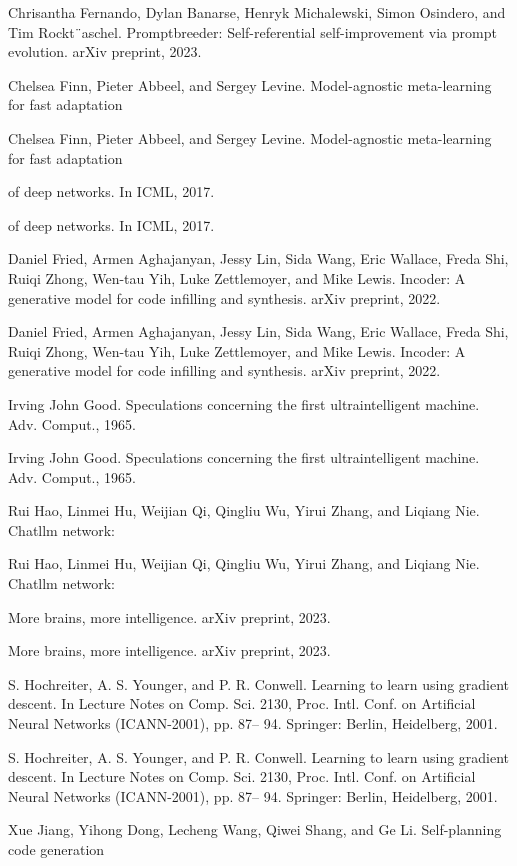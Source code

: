 \documentclass[12pt]{article}
\begin{document}
Chrisantha Fernando, Dylan Banarse, Henryk Michalewski, Simon Osindero, and Tim Rockt¨aschel.
Promptbreeder: Self-referential self-improvement via prompt evolution. arXiv preprint, 2023.


Chelsea Finn, Pieter Abbeel, and Sergey Levine. Model-agnostic meta-learning for fast adaptation


Chelsea Finn, Pieter Abbeel, and Sergey Levine. Model-agnostic meta-learning for fast adaptation


of deep networks. In ICML, 2017.


of deep networks. In ICML, 2017.


Daniel Fried, Armen Aghajanyan, Jessy Lin, Sida Wang, Eric Wallace, Freda Shi, Ruiqi Zhong,
Wen-tau Yih, Luke Zettlemoyer, and Mike Lewis. Incoder: A generative model for code infilling
and synthesis. arXiv preprint, 2022.


Daniel Fried, Armen Aghajanyan, Jessy Lin, Sida Wang, Eric Wallace, Freda Shi, Ruiqi Zhong,
Wen-tau Yih, Luke Zettlemoyer, and Mike Lewis. Incoder: A generative model for code infilling
and synthesis. arXiv preprint, 2022.


Irving John Good. Speculations concerning the first ultraintelligent machine. Adv. Comput., 1965.


Irving John Good. Speculations concerning the first ultraintelligent machine. Adv. Comput., 1965.


Rui Hao, Linmei Hu, Weijian Qi, Qingliu Wu, Yirui Zhang, and Liqiang Nie. Chatllm network:


Rui Hao, Linmei Hu, Weijian Qi, Qingliu Wu, Yirui Zhang, and Liqiang Nie. Chatllm network:


More brains, more intelligence. arXiv preprint, 2023.


More brains, more intelligence. arXiv preprint, 2023.


S. Hochreiter, A. S. Younger, and P. R. Conwell. Learning to learn using gradient descent. In Lecture
Notes on Comp. Sci. 2130, Proc. Intl. Conf. on Artificial Neural Networks (ICANN-2001), pp. 87–
94. Springer: Berlin, Heidelberg, 2001.


S. Hochreiter, A. S. Younger, and P. R. Conwell. Learning to learn using gradient descent. In Lecture
Notes on Comp. Sci. 2130, Proc. Intl. Conf. on Artificial Neural Networks (ICANN-2001), pp. 87–
94. Springer: Berlin, Heidelberg, 2001.


Xue Jiang, Yihong Dong, Lecheng Wang, Qiwei Shang, and Ge Li. Self-planning code generation
\end{document}
